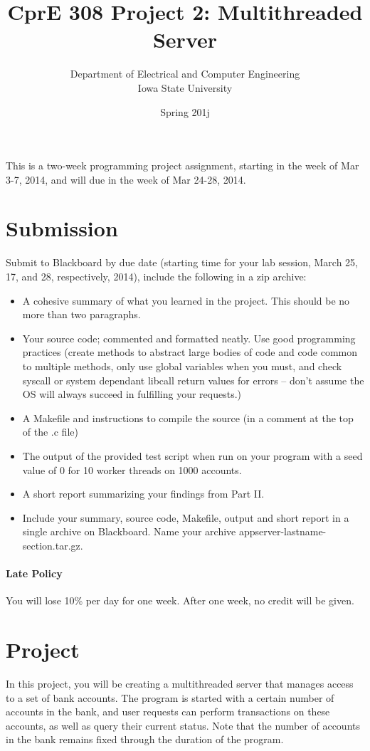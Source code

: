 \documentclass[letterpaper,10pt]{article}
\title{CprE 308 Project 2: Multithreaded Server}
\author{Department of Electrical and Computer Engineering \\ Iowa State University}
\date{Spring 201j}
\begin{document}
\maketitle

This is a two-week programming project assignment, starting in the week of Mar 3-7, 2014,
and will due in the week of Mar 24-28, 2014.

\section{Submission}

Submit to Blackboard by due date (starting time for your lab session, March 25, 17, and 28,
respectively, 2014), include the following in a zip archive:

\begin{itemize}
 \item A cohesive summary of what you learned in the project. This should be no more than two paragraphs.
 \item Your source code; commented and formatted neatly. Use good programming practices
  (create methods to abstract large bodies of code and code common to multiple methods, only use global
  variables when you must, and check syscall or system dependant libcall return values for errors -- don't assume
  the OS will always succeed in fulfilling your requests.)
 \item A Makefile and instructions to compile the source (in a comment at the top of the .c file)
 \item The output of the provided test script when run on your program with a seed value of 0 for 10
 worker threads on 1000 accounts.
 \item A short report summarizing your findings from Part II.
 \item Include your summary, source code, Makefile, output and short report in a single archive on Blackboard.
 Name your archive appserver-lastname-section.tar.gz.
\end{itemize}

\paragraph{Late Policy}
You will lose 10\% per day for one week. After one week, no credit will be given.

\section{Project}
In this project, you will be creating a multithreaded server that manages access to a set of bank accounts.
The program is started with a certain number of accounts in the bank, and user requests can perform
transactions on these accounts, as well as query their current status. Note that the number of accounts
in the bank remains fixed through the duration of the program.
\end{document}
